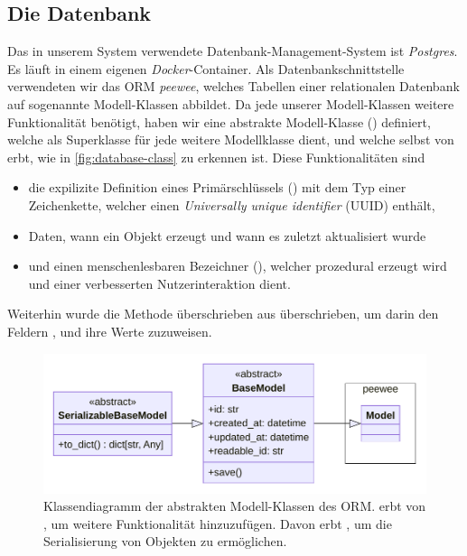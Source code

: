 \subsection{Die Datenbank}

Das in unserem System verwendete Datenbank-Management-System ist \emph{Postgres}. Es läuft in einem eigenen \emph{Docker}-Container. Als Datenbankschnittstelle verwendeten wir das ORM \emph{peewee}, welches Tabellen einer relationalen Datenbank auf sogenannte Modell-Klassen abbildet. Da jede unserer Modell-Klassen weitere Funktionalität benötigt, haben wir eine abstrakte Modell-Klasse () definiert, welche als Superklasse für jede weitere Modellklasse dient, und welche selbst von  erbt, wie in \autoref{fig:database-class} zu erkennen ist. Diese Funktionalitäten sind
\begin{itemize}
	\item die expilizite Definition eines Primärschlüssels () mit dem Typ einer Zeichenkette, welcher einen \emph{Universally unique identifier} (UUID) enthält,
	\item Daten, wann ein Objekt erzeugt und wann es zuletzt aktualisiert wurde
	\item und einen menschenlesbaren Bezeichner (), welcher prozedural erzeugt wird und einer verbesserten Nutzerinteraktion dient.
\end{itemize}
Weiterhin wurde die Methode  überschrieben aus  überschrieben, um darin den Feldern ,  und  ihre Werte zuzuweisen.

\begin{figure}[!ht]
	\centering
	\includegraphics[width=0.75\linewidth]{images/diagrams/database-class.pdf}
	\caption{Klassendiagramm der abstrakten Modell-Klassen des ORM.  erbt von , um weitere Funktionalität hinzuzufügen. Davon erbt , um die Serialisierung von Objekten zu ermöglichen.}
	\label{fig:database-class}
\end{figure}


